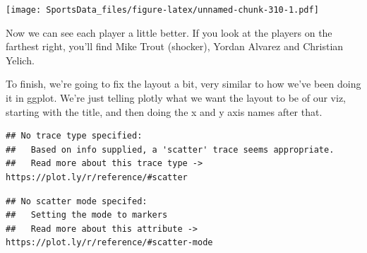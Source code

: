 \documentclass[
]{book}
\newenvironment{Shaded}{\begin{snugshade}}{\end{snugshade}}
\newcommand{\DataTypeTok}[1]{\textcolor[rgb]{0.13,0.29,0.53}{#1}}
\newcommand{\KeywordTok}[1]{\textcolor[rgb]{0.13,0.29,0.53}{\textbf{#1}}}
\newcommand{\NormalTok}[1]{#1}
\newcommand{\OperatorTok}[1]{\textcolor[rgb]{0.81,0.36,0.00}{\textbf{#1}}}
\newcommand{\StringTok}[1]{\textcolor[rgb]{0.31,0.60,0.02}{#1}}
\begin{document}
\texttt{[image: SportsData\_files/figure-latex/unnamed-chunk-310-1.pdf]}

Now we can see each player a little better. If you look at the players on the farthest right, you'll find Mike Trout (shocker), Yordan Alvarez and Christian Yelich.

To finish, we're going to fix the layout a bit, very similar to how we've been doing it in ggplot. We're just telling plotly what we want the layout to be of our viz, starting with the title, and then doing the x and y axis names after that.

\begin{Shaded}
\end{Shaded}

\begin{verbatim}
## No trace type specified:
##   Based on info supplied, a 'scatter' trace seems appropriate.
##   Read more about this trace type -> https://plot.ly/r/reference/#scatter
\end{verbatim}

\begin{verbatim}
## No scatter mode specifed:
##   Setting the mode to markers
##   Read more about this attribute -> https://plot.ly/r/reference/#scatter-mode
\end{verbatim}
\end{document}
